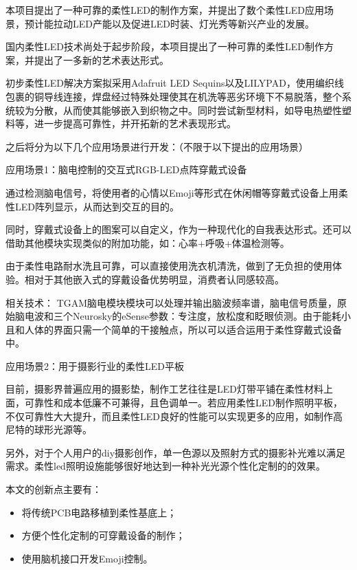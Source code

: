 \begin{cabstract}
本项目提出了一种可靠的柔性LED的制作方案，并提出了数个柔性LED应用场景，预计能拉动LED产能以及促进LED时装、灯光秀等新兴产业的发展。

国内柔性LED技术尚处于起步阶段，本项目提出了一种可靠的柔性LED制作方案，并提出了一多新的艺术表达形式。

初步柔性LED解决方案拟采用Adafruit LED Sequins以及LILYPAD，使用编织线包裹的铜导线连接，焊盘经过特殊处理使其在机洗等恶劣环境下不易脱落，整个系统较为分散，从而使其能够嵌入到织物之中。同时尝试新型材料，如导电热塑性塑料等，进一步提高可靠性，并开拓新的艺术表现形式。

之后将分为以下几个应用场景进行开发：（不限于以下提出的应用场景）

{\heiti 应用场景1：脑电控制的交互式RGB-LED点阵穿戴式设备 }

通过检测脑电信号，将使用者的心情以Emoji等形式在休闲帽等穿戴式设备上用柔性LED阵列显示，从而达到交互的目的。

同时，穿戴式设备上的图案可以自定义，作为一种现代化的自我表达形式。还可以借助其他模块实现类似的附加功能，如：心率+呼吸+体温检测等。

由于柔性电路耐水洗且可靠，可以直接使用洗衣机清洗，做到了无负担的使用体验。相对于其他嵌入式的穿戴设备优势明显，消费者认同感较高。

相关技术：
TGAM脑电模块模块可以处理并输出脑波频率谱，脑电信号质量，原始脑电波和三个Neurosky的eSense参数：专注度，放松度和眨眼侦测。由于能耗小且和人体的界面只需一个简单的干接触点，所以可以适合运用于柔性穿戴式设备中。

{\heiti 应用场景2：用于摄影行业的柔性LED平板 }

目前，摄影界普遍应用的摄影垫，制作工艺往往是LED灯带平铺在柔性材料上面，可靠性和成本低廉不可兼得，且色调单一。若应用柔性LED制作照明平板，不仅可靠性大大提升，而且柔性LED良好的性能可以实现更多的应用，如制作高尼特的球形光源等。

另外，对于个人用户的diy摄影创作，单一色源以及照射方式的摄影补光难以满足需求。柔性led照明设施能够很好地达到一种补光光源个性化定制的的效果。


  本文的创新点主要有：
  \begin{itemize}
    \item 将传统PCB电路移植到柔性基底上；
    \item 方便个性化定制的可穿戴设备的制作；
    \item 使用脑机接口开发Emoji控制。
  \end{itemize}

\end{cabstract}

